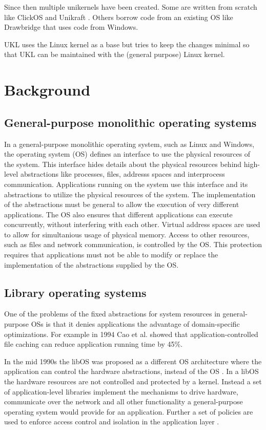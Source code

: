 \documentclass[10pt,twocolumn,a4paper]{article}
\begin{document}
  Since then multiple unikernels have been created. Some are written from scratch like
  ClickOS \cite{martins2014} and Unikraft \cite{kuenzer21}.
  Others borrow code from an existing OS like Drawbridge \cite{porter11} 
  that uses code from Windows.

  UKL uses the Linux kernel as a base but tries to keep the changes minimal
  so that UKL can be maintained with the (general purpose) Linux kernel.
  

\section{Background}\label{sec:background}
  \subsection{General-purpose monolithic operating systems}
    In a general-purpose monolithic operating system, such as Linux and Windows,
    the operating system (OS) defines an interface to use the physical resources
    of the system. 
    This interface hides details about the physical resources behind
    high-level abstractions like processes, files, addresss spaces 
    and interprocess communication.
    Applications running on the system use this interface and its abstractions
    to utilize the physical resources of the system.
    The implementation of the abstractions must be general to allow the execution 
    of very different applications.
    The OS also ensures that different applications can execute concurrently, 
    without interfering with each other. 
    Virtual address spaces are used to allow for simultanious usage of physical memory.
    Access to other resources, such as files and network communication, is controlled
    by the OS.
    This protection requires that applications must not be able
    to modify or replace the implementation of the abstractions supplied by the OS.

  \subsection{Library operating systems}
    One of the problems of the fixed abstractions for system resources in general-purpose OSs
    is that it denies applications the advantage of domain-specific optimizations.
    For example in 1994 Cao et al. \cite{cao94} showed that application-controlled file caching
    can reduce application running time by 45\%.

    In the mid 1990s the libOS was proposed as a different OS architecture
    where the application can control the hardware abstractions, instead of the OS \cite{engler95}.
    In a libOS the hardware resources are not controlled and protected by a kernel.
    Instead a set of application-level libraries implement the mechanisms to drive hardware,
    communicate over the network and all other functionality a general-purpose 
    operating system would provide for an application.
    Further a set of policies are used to enforce access control and isolation in the
    application layer \cite{madhavapeddy13-2}.
    
\end{document}
